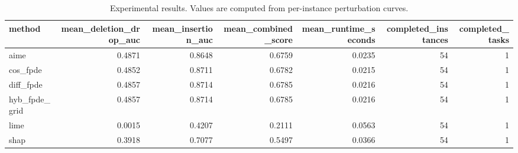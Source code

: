 \begin{table}[t]
\caption{Experimental results. Values are computed from per-instance perturbation curves.}
\label{tab:main_results_computed}
\centering
\begin{tabular}{lrrrrrr}
\toprule
method & mean\_deletion\_drop\_auc & mean\_insertion\_auc & mean\_combined\_score & mean\_runtime\_seconds & completed\_instances & completed\_tasks \\
\midrule
aime & 0.4871 & 0.8648 & 0.6759 & 0.0235 & 54 & 1 \\
cos\_fpde & 0.4852 & 0.8711 & 0.6782 & 0.0215 & 54 & 1 \\
diff\_fpde & 0.4857 & 0.8714 & 0.6785 & 0.0216 & 54 & 1 \\
hyb\_fpde\_grid & 0.4857 & 0.8714 & 0.6785 & 0.0216 & 54 & 1 \\
lime & 0.0015 & 0.4207 & 0.2111 & 0.0563 & 54 & 1 \\
shap & 0.3918 & 0.7077 & 0.5497 & 0.0366 & 54 & 1 \\
\bottomrule
\end{tabular}

\end{table}
